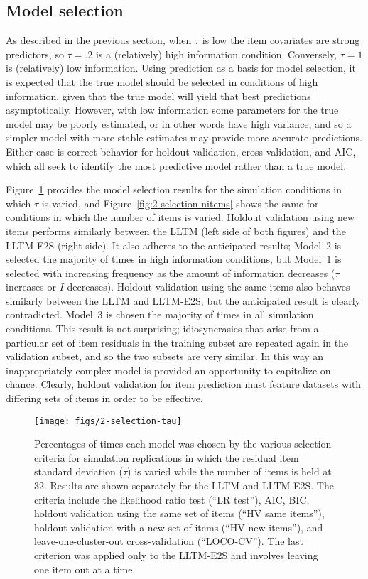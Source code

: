 \subsection{Model selection}

As described in the previous section, when $\tau$ is low the item covariates are strong predictors, so $\tau = .2$ is a (relatively) high information condition. Conversely, $\tau = 1$ is (relatively) low information. 
Using prediction as a basis for model selection, it is expected that the true model should be selected in conditions of high information, given that the true model will yield that best predictions asymptotically.
However, with low information some parameters for the true model may be poorly estimated, or in other words have high variance, and so a simpler model with more stable estimates may provide more accurate predictions.
Either case is correct behavior for holdout validation, cross-validation, and AIC, which all seek to identify the most predictive model rather than a true model.

Figure~\ref{fig:2-selection-tau} provides the model selection results for the simulation conditions in which $\tau$ is varied, and Figure~\ref{fig:2-selection-nitems} shows the same for conditions in which the number of items is varied. Holdout validation using new items performs similarly between the LLTM (left side of both figures) and the LLTM-E2S (right side). It also adheres to the anticipated results; Model~2 is selected the majority of times in high information conditions, but Model~1 is selected with increasing frequency as the amount of information decreases ($\tau$ increases or $I$ decreases). Holdout validation using the same items also behaves similarly between the LLTM and LLTM-E2S, but the anticipated result is clearly contradicted. Model~3 is chosen the majority of times in all simulation conditions. This result is not surprising; idiosyncrasies that arise from a particular set of item residuals in the training subset are repeated again in the validation subset, and so the two subsets are very similar. In this way an inappropriately complex model is provided an opportunity to capitalize on chance. Clearly, holdout validation for item prediction must feature datasets with differing sets of items in order to be effective.

\begin{figure}
	\centering
	\texttt{[image: figs/2-selection-tau]}
	\caption{Percentages of times each model was chosen by the various selection criteria for simulation replications in which the residual item standard deviation ($\tau$) is varied while the number of items is held at 32. Results are shown separately for the LLTM and LLTM-E2S. The criteria include the likelihood ratio test (``LR test''), AIC, BIC, holdout validation using the same set of items (``HV same items''), holdout validation with a new set of items (``HV new items''), and leave-one-cluster-out cross-validation (``LOCO-CV''). The last criterion was applied only to the LLTM-E2S and involves leaving one item out at a time.}	
	\label{fig:2-selection-tau}
\end{figure}

